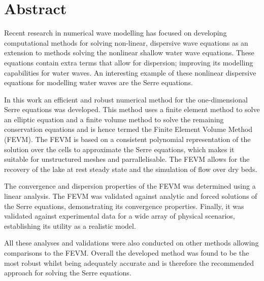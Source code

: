 \chapter*{Abstract}\label{abstract}


Recent research in numerical wave modelling has focused on developing computational methods for solving non-linear, dispersive wave equations as an extension to methods solving the nonlinear shallow water wave equations. These equations contain extra terms that allow for dispersion; improving its modelling capabilities for water waves. An interesting example of these nonlinear dispersive equations for modelling water waves are the Serre equations. 

In this work an efficient and robust numerical method for the one-dimensional Serre equations was developed. This method uses a finite element method to solve an elliptic equation and a finite volume method to solve the remaining conservation equations and is hence termed the Finite Element Volume Method (FEVM). The FEVM is based on a consistent polynomial representation of the solution over the cells to approximate the Serre equations, which makes it suitable for unstructured meshes and parrallelisable. The FEVM allows for the recovery of the lake at rest steady state and the simulation of flow over dry beds.  

The convergence and dispersion properties of the FEVM was determined using a linear analysis. The FEVM was validated against analytic and forced solutions of the Serre equations, demonstrating its convergence properties. Finally, it was validated against experimental data for a wide array of physical scenarios, establishing its utility as a realistic model.

All these analyses and validations were also conducted on other methods allowing comparisons to the FEVM. Overall the developed method was found to be the most robust whilst being adequately accurate and is therefore the recommended approach for solving the Serre equations.


